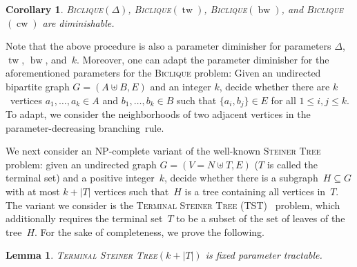 \documentclass[11pt,a4,USenglish]{article}
\newcommand{\prob}[1]{\textsc{#1}}
\newcommand{\pprob}[2]{\prob{#1}$(#2)$}
\newcommand{\NP}{\textnormal{NP}}
\DeclareMathOperator{\tw}{tw}
\DeclareMathOperator{\bw}{bw}
\DeclareMathOperator{\cw}{cw}
\theoremstyle{definition}
\theoremstyle{plain}
\newtheorem{lem}{Lemma}
\newtheorem{corollary}{Corollary}
\theoremstyle{remark}
\begin{document}
  \begin{corollary}
  \label{lem:bicliquecw}
  \pprob{Biclique}{\Delta}, \pprob{Biclique}{\tw}, \pprob{Biclique}{\bw}, and \pprob{Biclique}{\cw} are diminishable.
  \end{corollary}
\else{} 
 Note that the above procedure is also a parameter diminisher for parameters $\Delta$, $\tw$, $\bw$, and~$k$.
 Moreover, one can adapt the parameter diminisher for the aforementioned parameters for the \textsc{Biclique} problem: Given an undirected bipartite graph $G=(A \uplus B, E)$ and an integer $k$, decide whether there are $k$~vertices $a_1,\ldots,a_k \in A$ and $b_1,\ldots,b_k\in B$ such that $\{a_i,b_j\} \in E$ for all $1 \leq i , j \leq k$. 
 To adapt, we consider the neighborhoods of two adjacent vertices in the parameter-decreasing branching~rule.
\fi{}
%
%
%
%
%
%
%
%
%
%
%
%
%
%
%
%
%
%
%
%
%
%
%
%
%
%
%
%
%
%
%
%
%
%
%
%
%
%
%
%
%
%
%
%
%
%
%
%
%
%
%
%
%
%
%
%
%
%
%
%
%
%
%
%
%
%
%
%
%
%
%
%
%
%
%
%
%
%
%
%
%
%
%
%
%
%
%
%
%
%
%


%

%
%
%
%
%
%
%
%
We next consider an \NP-complete variant of the well-known \textsc{Steiner Tree} problem: given an undirected graph $G=(V=N\uplus T,E)$ ($T$ is called the terminal set) and a positive integer~$k$, decide whether there is a subgraph~$H\subseteq G$ with at most $k+|T|$ vertices such that~$H$ is a tree containing all vertices in~$T$. 
The variant we consider is the \textsc{Terminal Steiner Tree (TST)}~\iflong{}\cite{LinX02,BiniazMS15}\else{}\cite{LinX02}\fi{} problem, which additionally requires the terminal set~$T$ to be a subset of the set of leaves of the tree~$H$. 
For the sake of completeness, we prove the following.

\begin{lem}
\pprob{Terminal Steiner Tree}{k+|T|} is fixed parameter tractable. 
\end{lem}
\end{document}
